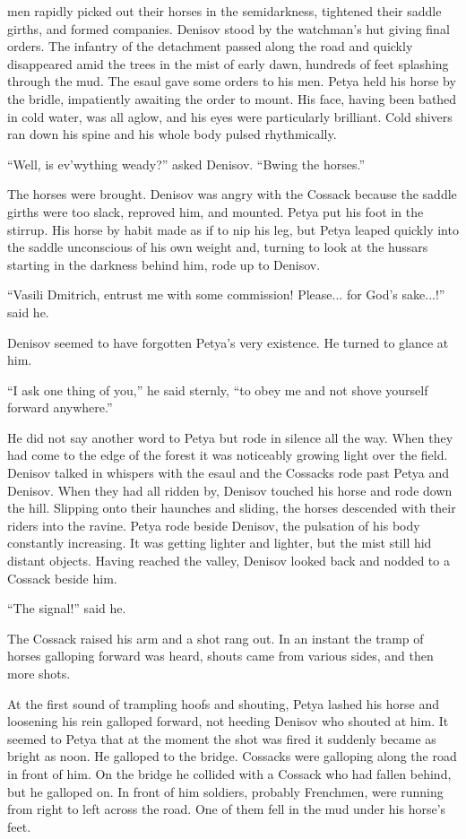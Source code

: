  men rapidly picked out their horses in the semidarkness,
tightened their saddle girths, and formed companies. Denisov
stood by the watchman's hut giving final orders. The infantry of
the detachment passed along the road and quickly disappeared amid
the trees in the mist of early dawn, hundreds of feet splashing
through the mud. The esaul gave some orders to his men. Petya
held his horse by the bridle, impatiently awaiting the order to
mount. His face, having been bathed in cold water, was all aglow,
and his eyes were particularly brilliant.  Cold shivers ran down
his spine and his whole body pulsed rhythmically.

``Well, is ev'wything weady?'' asked Denisov. ``Bwing the
horses.''

The horses were brought. Denisov was angry with the Cossack
because the saddle girths were too slack, reproved him, and
mounted. Petya put his foot in the stirrup. His horse by habit
made as if to nip his leg, but Petya leaped quickly into the
saddle unconscious of his own weight and, turning to look at the
hussars starting in the darkness behind him, rode up to Denisov.

``Vasili Dmitrich, entrust me with some commission! Please... for
God's sake...!'' said he.

Denisov seemed to have forgotten Petya's very existence. He
turned to glance at him.

``I ask one thing of you,'' he said sternly, ``to obey me and not
shove yourself forward anywhere.''

He did not say another word to Petya but rode in silence all the
way.  When they had come to the edge of the forest it was
noticeably growing light over the field. Denisov talked in
whispers with the esaul and the Cossacks rode past Petya and
Denisov. When they had all ridden by, Denisov touched his horse
and rode down the hill. Slipping onto their haunches and sliding,
the horses descended with their riders into the ravine. Petya
rode beside Denisov, the pulsation of his body constantly
increasing. It was getting lighter and lighter, but the mist
still hid distant objects. Having reached the valley, Denisov
looked back and nodded to a Cossack beside him.

``The signal!'' said he.

The Cossack raised his arm and a shot rang out. In an instant the
tramp of horses galloping forward was heard, shouts came from
various sides, and then more shots.

At the first sound of trampling hoofs and shouting, Petya lashed
his horse and loosening his rein galloped forward, not heeding
Denisov who shouted at him. It seemed to Petya that at the moment
the shot was fired it suddenly became as bright as noon. He
galloped to the bridge.  Cossacks were galloping along the road
in front of him. On the bridge he collided with a Cossack who had
fallen behind, but he galloped on. In front of him soldiers,
probably Frenchmen, were running from right to left across the
road. One of them fell in the mud under his horse's feet.

